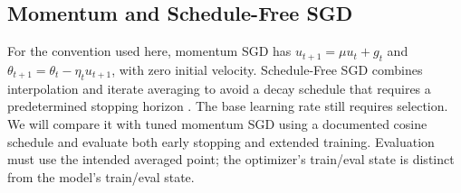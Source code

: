 \subsection{Momentum and Schedule-Free SGD}\label{sec:method-m2}

For the convention used here, momentum SGD has $u_{t+1}=\mu u_t+g_t$ and
$\theta_{t+1}=\theta_t-\eta_tu_{t+1}$, with zero initial velocity.
Schedule-Free SGD combines interpolation and iterate averaging to avoid a decay schedule
that requires a predetermined stopping horizon \citep{defazio2024schedule}.
The base learning rate still requires selection. We will compare it with tuned momentum
SGD using a documented cosine schedule and evaluate both early stopping and extended training.
Evaluation must use the intended averaged point; the optimizer's train/eval state is distinct
from the model's train/eval state.

